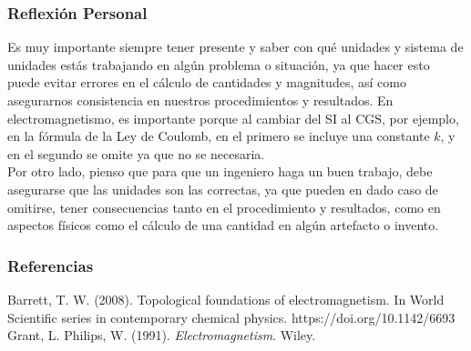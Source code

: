 \documentclass[12pt, letterpaper]{report}
\begin{document}
\subsubsection*{Reflexión Personal}
Es muy importante siempre tener presente y saber con qué unidades y sistema de unidades estás trabajando 
en algún problema o situación, ya que hacer esto puede evitar errores en el cálculo de cantidades y magnitudes, 
así como asegurarnos consistencia en nuestros procedimientos y resultados. En electromagnetismo, es importante 
porque al cambiar del SI al CGS, por ejemplo, en la fórmula de la Ley de Coulomb, en el primero se incluye una constante 
$k$, y en el segundo se omite ya que no se necesaria. \\
Por otro lado, pienso que para que un ingeniero haga un buen trabajo, debe asegurarse que las unidades son las correctas, 
ya que pueden en dado caso de omitirse, tener consecuencias tanto en el procedimiento y resultados, como en aspectos físicos 
como el cálculo de una cantidad en algún artefacto o invento. 

\subsubsection*{Referencias}
Barrett, T. W. (2008). Topological foundations of electromagnetism. In World Scientific series in contemporary chemical physics. https://doi.org/10.1142/6693\\

Grant, L. Philips, W. (1991). \textit{Electromagnetism}. Wiley. 
\end{document}
